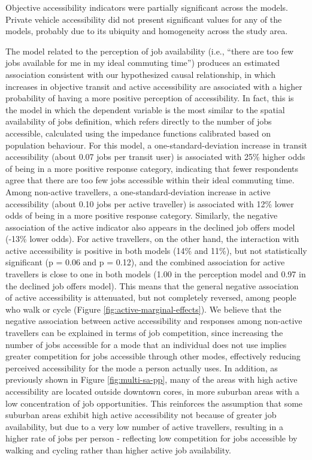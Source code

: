 \documentclass[preprint, 3p,
authoryear]{elsarticle} %
\begin{document}
Objective accessibility indicators were partially significant across the
models. Private vehicle accessibility did not present significant values
for any of the models, probably due to its ubiquity and homogeneity
across the study area.

The model related to the perception of job availability (i.e., ``there
are too few jobs available for me in my ideal commuting time'') produces
an estimated association consistent with our hypothesized causal
relationship, in which increases in objective transit and active
accessibility are associated with a higher probability of having a more
positive perception of accessibility. In fact, this is the model in
which the dependent variable is the most similar to the spatial
availability of jobs definition, which refers directly to the number of
jobs accessible, calculated using the impedance functions calibrated
based on population behaviour. For this model, a one-standard-deviation
increase in transit accessibility (about 0.07 jobs per transit user) is
associated with 25\% higher odds of being in a more positive response
category, indicating that fewer respondents agree that there are too few
jobs accessible within their ideal commuting time. Among non-active
travellers, a one-standard-deviation increase in active accessibility
(about 0.10 jobs per active traveller) is associated with 12\% lower
odds of being in a more positive response category. Similarly, the
negative association of the active indicator also appears in the
declined job offers model (-13\% lower odds). For active travellers, on
the other hand, the interaction with active accessibility is positive in
both models (14\% and 11\%), but not statistically significant (p = 0.06
and p = 0.12), and the combined association for active travellers is
close to one in both models (1.00 in the perception model and 0.97 in
the declined job offers model). This means that the general negative
association of active accessibility is attenuated, but not completely
reversed, among people who walk or cycle (Figure
\ref{fig:active-marginal-effects}). We believe that the negative
association between active accessibility and responses among non-active
travellers can be explained in terms of job competition, since
increasing the number of jobs accessible for a mode that an individual
does not use implies greater competition for jobs accessible through
other modes, effectively reducing perceived accessibility for the mode a
person actually uses. In addition, as previously shown in Figure
\ref{fig:multi-sa-pp}, many of the areas with high active accessibility
are located outside downtown cores, in more suburban areas with a low
concentration of job opportunities. This reinforces the assumption that
some suburban areas exhibit high active accessibility not because of
greater job availability, but due to a very low number of active
travellers, resulting in a higher rate of jobs per person - reflecting
low competition for jobs accessible by walking and cycling rather than
higher active job availability.
\end{document}
